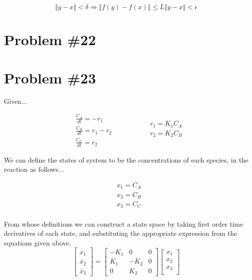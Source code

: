 \documentclass[12px]{article}
\begin{document}
$$ \left\Vert y - x \right\Vert < \delta \Rightarrow \left\Vert f(y) - f(x) \right\Vert \leq L \left\Vert y - x \right\Vert < \epsilon   $$

\section{Problem \#22}

\section{Problem \#23}

Given...

\begin{equation*}
    \begin{aligned}
        & \frac{C_{A}}{dt} = -r_{1} \\
        & \frac{C_{B}}{dt} = r_{1} - r_{2} \\
        & \frac{C_{C}}{dt} = r_{2}
    \end{aligned}
    \qquad \qquad
    \begin{aligned}
        & r_{1} = K_{1}C_{A} \\
        & r_{2} = K_{2}C_{B} \\
    \end{aligned}
\end{equation*}

We can define the states of system to be the concentrations of each species, in the reaction as follows...

\begin{equation*}
    \begin{aligned}
        & x_{1} = C_{A} \\
        & x_{2} = C_{B} \\
        & x_{3} = C_{C} \\
    \end{aligned}
\end{equation*}

From whose definitions we can construct a state space by taking first order time derivatives of each state, and substituting the appropriate expression from the equations given above. \\
$$
\begin{bmatrix}
    \dot{x_{1}} \\
    \dot{x_{2}} \\
    \dot{x_{3}}
\end{bmatrix}
=
\begin{bmatrix}
    -K_{1} & 0 & 0 \\
    K_{1} & -K_{2} & 0 \\
    0 & K_{2} & 0
\end{bmatrix}
\begin{bmatrix}
    x_{1} \\
    x_{2} \\
    x_{3} \\
\end{bmatrix}
$$
\end{document}
